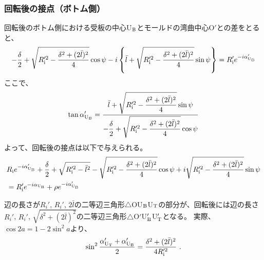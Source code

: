 \subsubsection{回転後の接点（ボトム側）}
回転後のボトム側における受板の中心U$_\text B$とモールドの湾曲中心O$'$との差をとると、
\begin{align*}
  -\frac\delta2+\sqrt{R_\text i'^2-\frac{\delta^2+(2\bar l)^2}4}\cos\psi
  -i\left\{\bar l+\sqrt{R_\text i'^2-\frac{\delta^2+(2\bar l)^2}4}\sin\psi\right\}
  = R_\text i'e^{-i\alpha'_{\text U_\text B}}
\end{align*}
ここで、
\begin{align*}
  \tan\alpha'_{\text U_\text B}
  = \frac{\displaystyle\bar l+\sqrt{R_\text i'^2-\frac{\delta^2+(2\bar l)^2}4}\sin\psi}
         {\displaystyle-\frac\delta2+\sqrt{R_\text i'^2-\frac{\delta^2+(2\bar l)^2}4}\cos\psi}
\end{align*}
よって、回転後の接点は以下で与えられる。
\begin{align}
  \notag
  &  R_\text ie^{-i\alpha'_{\text U_\text B}}
     +\frac\delta2+\sqrt{R_\text i'^2-\bar l^2}-\sqrt{R_\text i'^2-\frac{\delta^2+(2\bar l)^2}4}\cos\psi
     +i\sqrt{R_\text i'^2-\frac{\delta^2+(2\bar l)^2}4}\sin\psi\\
  &= R_\text i'e^{-i\alpha_{\text U_\text B}}+\rho e^{-i\alpha'_{\text U_\text B}}
   \label{eq:afterUBcontact}
\end{align}
\begin{hosokubox}
辺の長さが$R_i'$, $R_i'$, $2\bar l$の二等辺三角形$\triangle$OU$_\text B$U$_\text T$の部分が、回転後には辺の長さ$R_i'$, $R_i'$, $\sqrt{\delta^2+(2\bar l)^2}$の二等辺三角形$\triangle$O$'$U$_\text B'$U$_\text T'$となる。
実際、$\cos2a = 1-2\sin^2\!a$より、
\begin{align*}
  \sin^2\frac{\alpha'_{\text U_\text T}+\alpha'_{\text U_\text B}}2
  = \frac{\delta^2+(2\bar l)^2}{4R_\text i'^2}\ .
\end{align*}
\end{hosokubox}



